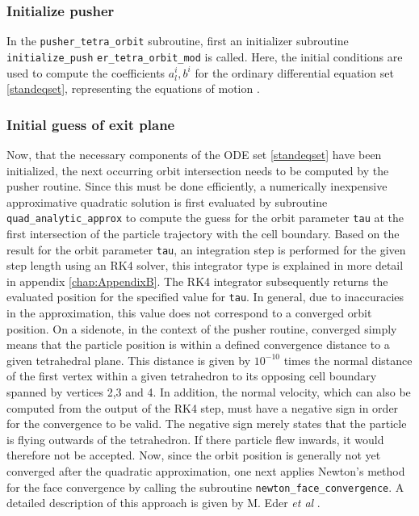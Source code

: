 \documentclass[./main.tex]{subfiles}
\begin{document}
\subsubsection{Initialize pusher} 
In the \texttt{pusher\_tetra\_orbit} subroutine, first an initializer subroutine \texttt{initialize\_push}
\texttt{er\_tetra\_orbit\_mod} is called. Here, the initial conditions are used to compute the coefficients $a^i_l, b^i$ for the ordinary differential equation set \ref{standeqset}, representing the equations of motion \cite{Eder_DA}.
\subsubsection{Initial guess of exit plane}
Now, that the necessary components of the ODE set \ref{standeqset} have been initialized, the next occurring orbit intersection needs to be computed by the pusher routine. Since this must be done efficiently, a numerically inexpensive approximative quadratic solution is first evaluated by subroutine \texttt{quad\_analytic\_approx} to compute the guess for the orbit parameter \texttt{tau} at the first intersection of the particle trajectory with the cell boundary. Based on the result for the orbit parameter \texttt{tau}, an integration step is performed for the given step length using an RK4 solver, this integrator type is explained in more detail in appendix \ref{chap:AppendixB}. The RK4 integrator subsequently returns the evaluated position for the specified value for \texttt{tau}. In general, due to inaccuracies in the approximation, this value does not correspond to a converged orbit position. 
On a sidenote, in the context of the pusher routine, converged simply means that the particle position is within a defined convergence distance to a given tetrahedral plane. This distance is given by $10^{-10}$ times the normal distance of the first vertex within a given tetrahedron to its opposing cell boundary spanned by vertices 2,3 and 4. In addition, the normal velocity, which can also be computed from the output of the RK4 step, must have a negative sign in order for the convergence to be valid. The negative sign merely states that the particle is flying outwards of the tetrahedron. If there particle flew inwards, it would therefore not be accepted. 
Now, since the orbit position is generally not yet converged after the quadratic approximation, one next applies Newton's method for the face convergence by calling the subroutine \texttt{newton\_face\_convergence}. A detailed description of this approach is given by M. Eder \textit{et al} \cite{Eder_DA}. 
\end{document}
